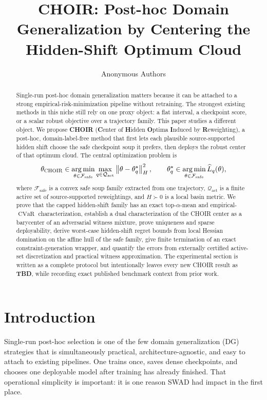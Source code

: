 \documentclass{article}
\title{CHOIR: Post-hoc Domain Generalization by Centering the Hidden-Shift Optimum Cloud}
\author{Anonymous Authors}
\newcommand{\cF}{\mathcal{F}}
\newcommand{\cQ}{\mathcal{Q}}
\newcommand{\argmin}{\operatorname*{arg\,min}}
\newcommand{\CVaR}{\operatorname{CVaR}}
\newcommand{\TBD}{\textbf{TBD}}
\newcommand{\choir}{\textup{\textsc{CHOIR}}}
\newcommand{\swad}{\textup{\textsc{SWAD}}}
\newcommand{\norm}[1]{\left\lVert #1 \right\rVert}
\newcommand{\safe}{\mathrm{safe}}
\newcommand{\act}{\mathrm{act}}
\begin{document}
\maketitle

\begin{abstract}
Single-run post-hoc domain generalization matters because it can be attached to a strong empirical-risk-minimization pipeline without retraining. The strongest existing methods in this niche still rely on one proxy object: a flat interval, a checkpoint score, or a scalar robust objective over a trajectory family. This paper studies a different object. We propose \textbf{\choir{}} (\textbf{C}enter of \textbf{H}idden \textbf{O}ptima \textbf{I}nduced by \textbf{R}eweighting), a post-hoc, domain-label-free method that first lets each plausible source-supported hidden shift choose the safe checkpoint soup it prefers, then deploys the robust center of that optimum cloud. The central optimization problem is
\[
\theta_{\choir}
\in
\argmin_{\theta\in\cF_{\safe}}
\max_{q\in\cQ_{\act}}
\norm{\theta-\theta_q^\star}_{H}^{2},
\qquad
\theta_q^\star \in \argmin_{\theta\in\cF_{\safe}} \widehat L_q(\theta),
\]
where \(\cF_{\safe}\) is a convex safe soup family extracted from one trajectory, \(\cQ_{\act}\) is a finite active set of source-supported reweightings, and \(H\succ 0\) is a local basin metric. We prove that the capped hidden-shift family has an exact top-\(\alpha\)-mean and empirical-\(\CVaR\) characterization, establish a dual characterization of the \choir{} center as a barycenter of an adversarial witness mixture, prove uniqueness and sparse deployability, derive worst-case hidden-shift regret bounds from local Hessian domination on the affine hull of the safe family, give finite termination of an exact constraint-generation wrapper, and quantify the errors from externally certified active-set discretization and practical witness approximation. The experimental section is written as a complete protocol but intentionally leaves every new \choir{} result as \TBD{}, while recording exact published benchmark context from prior work.
\end{abstract}

\section{Introduction}

Single-run post-hoc selection is one of the few domain generalization (DG) strategies that is simultaneously practical, architecture-agnostic, and easy to attach to existing pipelines. One trains once, saves dense checkpoints, and chooses one deployable model after training has already finished. That operational simplicity is important: it is one reason \swad{} had impact in the first place.
\end{document}

